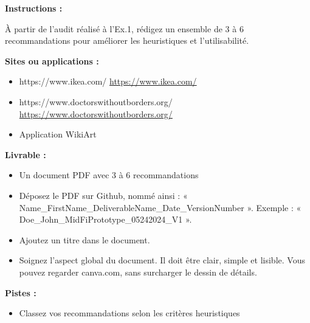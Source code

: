 \makeheaderfiles

\textbf{Instructions :}

À partir de l'audit réalisé à l'Ex.1, rédigez un ensemble de 3 à 6 recommandations pour améliorer les heuristiques et l'utilisabilité.

\textbf{Sites ou applications :}

\begin{itemize}
\item https://www.ikea.com/ \url{https://www.ikea.com/}
\item https://www.doctorswithoutborders.org/ \url{https://www.doctorswithoutborders.org/}
\item Application WikiArt
\end{itemize}

\textbf{Livrable :}

\begin{itemize}
\item Un document PDF avec 3 à 6 recommandations
\item Déposez le PDF sur Github, nommé ainsi : « Name\_FirstName\_DeliverableName\_Date\_VersionNumber ». Exemple : « Doe\_John\_MidFiPrototype\_05242024\_V1 ».
\item Ajoutez un titre dans le document.
\item Soignez l'aspect global du document. Il doit être clair, simple et lisible. Vous pouvez regarder canva.com, sans surcharger le dessin de détails.
\end{itemize}

\textbf{Pistes :}

\begin{itemize}
\item Classez vos recommandations selon les critères heuristiques
\end{itemize}

